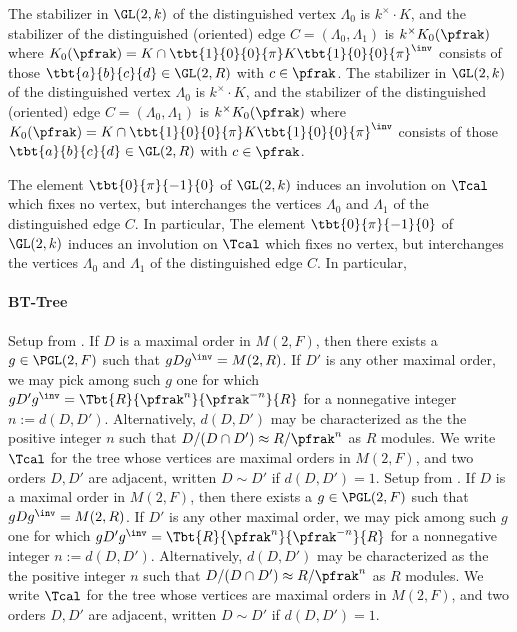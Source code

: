 \documentclass[draft]{amsart}
\begin{document}
The stabilizer in $\GL(2,k)$ of the distinguished vertex $\Lambda_0$ is $k^\times \cdot K$, and the stabilizer of the distinguished (oriented) edge $C = (\Lambda_0,\Lambda_1)$ is $k^\times K_0(\pfrak)$ where $K_0(\pfrak)=K\cap \tbt{1}{0}{0}{\pi}K\tbt{1}{0}{0}{\pi}^\inv$ consists of those $\tbt{a}{b}{c}{d} \in \GL(2,R)$  with $c \in \pfrak$.
The stabilizer in $\GL(2,k)$ of the distinguished vertex $\Lambda_0$ is $k^\times \cdot K$, and the stabilizer of the distinguished (oriented) edge $C = (\Lambda_0,\Lambda_1)$ is $k^\times K_0(\pfrak)$ where $K_0(\pfrak)=K\cap \tbt{1}{0}{0}{\pi}K\tbt{1}{0}{0}{\pi}^\inv$ consists of those $\tbt{a}{b}{c}{d} \in \GL(2,R)$  with $c \in \pfrak$.

The element $\tbt{0}{\pi}{-1}{0}$ of $\GL(2,k)$ induces an involution on $\Tcal$ which fixes no vertex, but interchanges the vertices $\Lambda_0$ and $\Lambda_1$ of the distinguished edge $C$. In particular,
The element $\tbt{0}{\pi}{-1}{0}$ of $\GL(2,k)$ induces an involution on $\Tcal$ which fixes no vertex, but interchanges the vertices $\Lambda_0$ and $\Lambda_1$ of the distinguished edge $C$. In particular,


\paragraph*{BT-Tree}
Setup from \cite{chinburgEmbeddingTheoremQuaternion1999}. If $D$ is a maximal order in $M(2,F)$, then there exists a $g\in \PGL(2,F)$ such that $g D g^\inv = M(2,R)$. If $D'$ is any other maximal order, we may pick among such $g$ one for which $gD'g^\inv = \Tbt{R}{\pfrak^n}{\pfrak^{-n}}{R}$ for a nonnegative integer $n:=d(D,D')$. Alternatively, $d(D,D')$ may be characterized as the the positive integer $n$ such that $D/(D\cap D') \approx R/\pfrak^n$ as $R$ modules. We write $\Tcal$ for the tree whose vertices are maximal orders in $M(2,F)$, and two orders $D,D'$ are adjacent, written $D \sim D'$ if $d(D,D')=1$.
Setup from \cite{chinburgEmbeddingTheoremQuaternion1999}. If $D$ is a maximal order in $M(2,F)$, then there exists a $g\in \PGL(2,F)$ such that $g D g^\inv = M(2,R)$. If $D'$ is any other maximal order, we may pick among such $g$ one for which $gD'g^\inv = \Tbt{R}{\pfrak^n}{\pfrak^{-n}}{R}$ for a nonnegative integer $n:=d(D,D')$. Alternatively, $d(D,D')$ may be characterized as the the positive integer $n$ such that $D/(D\cap D') \approx R/\pfrak^n$ as $R$ modules. We write $\Tcal$ for the tree whose vertices are maximal orders in $M(2,F)$, and two orders $D,D'$ are adjacent, written $D \sim D'$ if $d(D,D')=1$.
\end{document}

